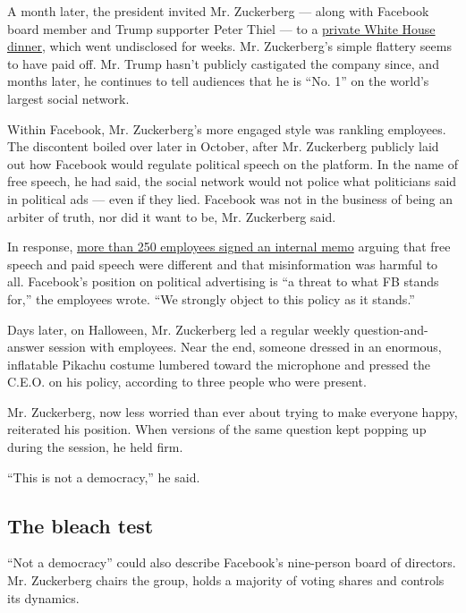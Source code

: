 A month later, the president invited Mr. Zuckerberg --- along with
Facebook board member and Trump supporter Peter Thiel --- to a
\href{https://www.nbcnews.com/news/amp/ncna1087986}{private White House
dinner}, which went undisclosed for weeks. Mr. Zuckerberg's simple
flattery seems to have paid off. Mr. Trump hasn't publicly castigated
the company since, and months later, he continues to tell audiences that
he is ``No. 1'' on the world's largest social network.

Within Facebook, Mr. Zuckerberg's more engaged style was rankling
employees. The discontent boiled over later in October, after Mr.
Zuckerberg publicly laid out how Facebook would regulate political
speech on the platform. In the name of free speech, he had said, the
social network would not police what politicians said in political ads
--- even if they lied. Facebook was not in the business of being an
arbiter of truth, nor did it want to be, Mr. Zuckerberg said.

In response,
\href{https://www.nytimes3xbfgragh.onion/2019/10/28/technology/facebook-mark-zuckerberg-political-ads.html}{more
than 250 employees signed an internal memo} arguing that free speech and
paid speech were different and that misinformation was harmful to all.
Facebook's position on political advertising is ``a threat to what FB
stands for,'' the employees wrote. ``We strongly object to this policy
as it stands.''

Days later, on Halloween, Mr. Zuckerberg led a regular weekly
question-and-answer session with employees. Near the end, someone
dressed in an enormous, inflatable Pikachu costume lumbered toward the
microphone and pressed the C.E.O. on his policy, according to three
people who were present.

Mr. Zuckerberg, now less worried than ever about trying to make everyone
happy, reiterated his position. When versions of the same question kept
popping up during the session, he held firm.

``This is not a democracy,'' he said.

\hypertarget{the-bleach-test}{%
\subsection{The bleach test}\label{the-bleach-test}}

``Not a democracy'' could also describe Facebook's nine-person board of
directors. Mr. Zuckerberg chairs the group, holds a majority of voting
shares and controls its dynamics.

